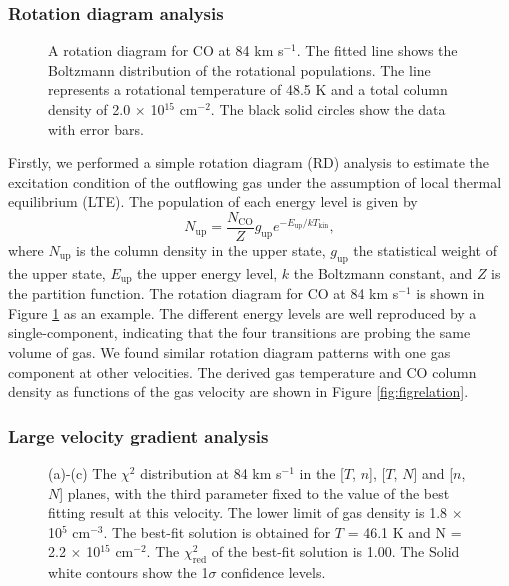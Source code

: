 \subsubsection{Rotation diagram analysis\label{subsec:RD}}

\begin{figure}[tbp]
\caption{A rotation diagram for CO at 84 km s$^{-1}$. The fitted line shows the Boltzmann distribution of the rotational populations. The line represents a rotational temperature of 48.5 K and a total column density of 2.0 $\times$ 10$^{15}$ cm$^{-2}$. The black solid circles show the data with error bars. \label{fig:figrd}}
\end{figure}

Firstly, we performed a simple rotation diagram (RD) analysis \citep{1999ApJ...517..209G} to estimate the excitation condition of the outflowing gas under the assumption of local thermal equilibrium (LTE). The population of each energy level is given by 
\begin{equation}
N_{\mathrm{up}} = \frac{N_\mathrm{CO}}{Z} g_\mathrm{up} e^{-E_\mathrm{up}/kT_\mathrm{kin}},
\end{equation}
where $N_\mathrm{up}$ is the column density in the upper state, $g_\mathrm{up}$ the statistical weight of the upper state, $E_\mathrm{up}$ the upper energy level, $k$ the Boltzmann constant, and $Z$ is the partition function. The rotation diagram for CO at 84 km s$^{-1}$ is shown in Figure \ref{fig:figrd} as an example. The different energy levels are well reproduced by a single-component, indicating that the four transitions are probing the same volume of gas. We found similar rotation diagram patterns with one gas component at other velocities. The derived gas temperature and CO column density as functions of the gas velocity are shown in Figure \ref{fig:figrelation}.

\subsubsection{Large velocity gradient analysis\label{subsec:LVG}}

\begin{figure}[!tbp]
\caption{(a)-(c) The $\chi^2$ distribution at 84 km s$^{-1}$ in the [$T$, $n$], [$T$, $N$] and [$n$, $N$] planes, with the third parameter fixed to the value of the best fitting result at this velocity. The lower limit of gas density is 1.8 $\times$ 10$^{5}$ cm$^{-3}$. The best-fit solution is obtained for $T$ =  46.1 K and N = 2.2 $\times$ 10$^{15}$ cm$^{-2}$. The $\chi^2_{\mathrm{red}}$ of the best-fit solution is 1.00. The Solid white contours show the 1$\sigma$ confidence levels. \label{fig:figchi}}
\end{figure}

